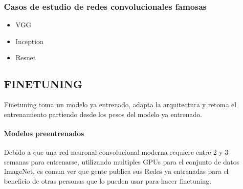 \documentclass[a4paper,10pt]{article}
\begin{document}
    \subsubsection {Casos de estudio de redes convolucionales famosas}
      \begin{itemize}
	\item VGG
	\item Inception
	\item Resnet
      \end{itemize}

    \subsection {FINETUNING}
      Finetuning toma un modelo ya entrenado, adapta la arquitectura y retoma el entrenamiento partiendo desde los pesos del modelo ya entrenado.
      \paragraph{Modelos preentrenados}
	Debido a que una red neuronal convolucional moderna requiere entre 2 y 3 semanas para entrenarse, utilizando multiples GPUs para el conjunto de datos ImageNet, es comun ver que gente
	publica sus Redes ya entrenadas para el beneficio de otras personas que lo pueden usar para hacer finetuning.
\end{document}
